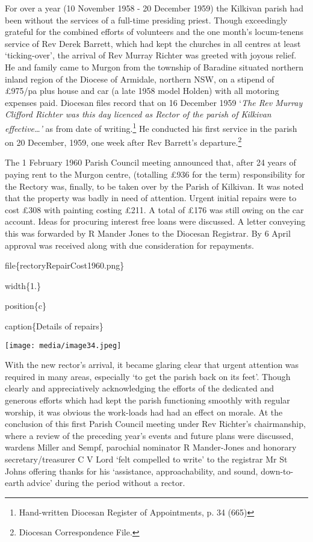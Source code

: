 For over a year (10 November 1958 - 20 December 1959) the Kilkivan parish had been without the services of a full-time presiding priest. Though exceedingly grateful for the combined efforts of volunteers and the one month's locum-tenens service of Rev Derek Barrett, which had kept the churches in all centres at least `ticking-over', the arrival of Rev Murray Richter was greeted with joyous relief. He and family came to Murgon from the township of Baradine situated northern inland region of the Diocese of Armidale, northern NSW, on a stipend of £975/pa plus house and car (a late 1958 model Holden) with all motoring expenses paid. Diocesan files record that on 16 December 1959 `\emph{The Rev Murray Clifford Richter was this day licenced as Rector of the parish of Kilkivan effective\ldots'} as from date of writing.\footnote{Hand-written Diocesan Register of Appointments, p. 34 (665)} He conducted his first service in the parish on 20 December, 1959, one week after Rev Barrett's departure.\footnote{Diocesan Correspondence File.}

The 1 February 1960 Parish Council meeting announced that, after 24 years of paying rent to the Murgon centre, (totalling £936 for the term) responsibility for the Rectory was, finally, to be taken over by the Parish of Kilkivan. It was noted that the property was badly in need of attention. Urgent initial repairs were to cost £308 with painting costing £211. A total of £176 was still owing on the car account. Ideas for procuring interest free loans were discussed. A letter conveying this was forwarded by R Mander Jones to the Diocesan Registrar. By 6 April approval was received along with due consideration for repayments.

file\{rectoryRepairCost1960.png\}

width\{1.\}

position\{c\}

caption\{Details of repairs\}

\texttt{[image: media/image34.jpeg]}

With the new rector's arrival, it became glaring clear that urgent attention was required in many areas, especially `to get the parish back on its feet'. Though clearly and appreciatively acknowledging the efforts of the dedicated and generous efforts which had kept the parish functioning smoothly with regular worship, it was obvious the work-loads had had an effect on morale. At the conclusion of this first Parish Council meeting under Rev Richter's chairmanship, where a review of the preceding year's events and future plans were discussed, wardens Miller and Sempf, parochial nominator R Mander-Jones and honorary secretary/treasurer C V Lord `felt compelled to write' to the registrar Mr St Johns offering thanks for his `assistance, approachability, and sound, down-to-earth advice' during the period without a rector.

